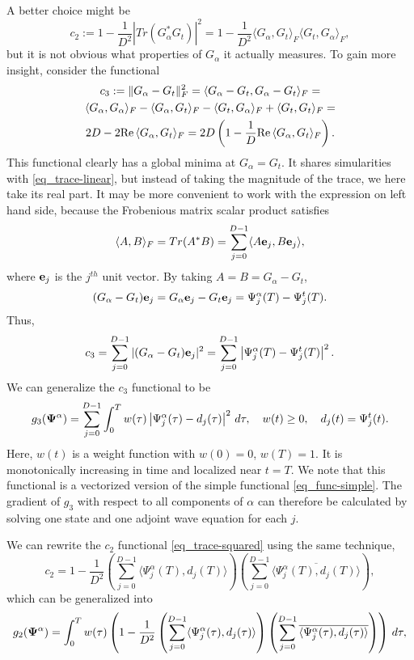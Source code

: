 \documentclass[11pt]{article}
\begin{document}
A better choice might be
\begin{equation}\label{eq_trace-squared}
c_2 := 1 - \frac{1}{D^2} |Tr (G_\alpha^* G_t)|^2 = 1 - \frac{1}{D^2} \langle G_\alpha, G_t \rangle_F
\langle G_t,  G_\alpha \rangle_F,
\end{equation}
but it is not obvious what properties of $G_\alpha$ it actually measures. To gain more insight,
consider the functional
\begin{multline}\label{eq_trace-real}
  c_3 := \| G_\alpha-G_t \|_F^2 = \langle G_\alpha-G_t, G_\alpha-G_t \rangle_F = \\
  \langle G_\alpha, G_\alpha \rangle_F - \langle G_\alpha, G_t \rangle_F  -
  \langle G_t, G_\alpha \rangle_F + \langle G_t, G_t \rangle_F =\\
  2D - 2{\rm Re}\, \langle G_\alpha, G_t \rangle_F = 2D\left( 1 - \frac{1}{D} {\rm Re}\, \langle
  G_\alpha, G_t \rangle_F\right). 
\end{multline}
This functional clearly has a global minima at $G_\alpha=G_t$. It shares simularities with
\eqref{eq_trace-linear}, but instead of taking the magnitude of the trace, we here take its real
part. It may be more convenient to work with the expression on left hand
side, because the Frobenious matrix scalar product satisfies
\[
\langle A, B \rangle_F = Tr(A^* B) = \sum_{j=0}^{D-1} \langle A{\mathbf e}_j, B{\mathbf e}_j\rangle,
\]
where ${\mathbf e}_j$ is the $j^{th}$ unit vector. By taking $A=B=G_\alpha - G_t$,
\[
(G_\alpha - G_t){\mathbf e}_j = G_\alpha{\mathbf e}_j - G_t{\mathbf e}_j = \Psi_j^\alpha(T) - \Psi_j^t(T).
\]
Thus,
\[
c_3 = \sum_{j=0}^{D-1} |(G_\alpha - G_t){\mathbf e}_j|^2 = \sum_{j=0}^{D-1} \left| \Psi_j^\alpha(T) -
\Psi_j^t(T) \right|^2.
\]
We can generalize the $c_3$ functional to be
\begin{equation}
g_3({\mathbf \Psi}^\alpha) =  \sum_{j=0}^{D-1} \int_0^T w(\tau) \left| \Psi_j^\alpha(\tau) - d_j(\tau)
\right|^2\, d\tau,\quad w(t) \geq 0,\quad d_j(t)=\Psi_j^t(t).
\end{equation}
Here, $w(t)$ is a weight function with $w(0)=0$, $w(T)=1$. It is monotonically increasing in time
and localized near $t=T$. We note that this functional is a
vectorized version of the simple functional \eqref{eq_func-simple}. The gradient of $g_3$ with
respect to all components of $\alpha$ can therefore be calculated by solving one state and one
adjoint wave equation for each $j$.

We can rewrite the $c_2$ functional \eqref{eq_trace-squared} using the same technique,
\[
c_2 = 1 - \frac{1}{D^2} \left( \sum_{j=0}^{D-1}\langle \Psi^\alpha_j(T), d_j(T)\rangle \right) \left(
\sum_{j=0}^{D-1}\overline{\langle \Psi^\alpha_j(T), d_j(T)\rangle} \right),
\]
which can be generalized into
\begin{equation}
  g_2({\mathbf \Psi}^\alpha) =  \int_0^T w(\tau) \left(
   1 - \frac{1}{D^2} \left( \sum_{j=0}^{D-1}\langle \Psi^\alpha_j(\tau), d_j(\tau)\rangle \right) \left(
\sum_{j=0}^{D-1}\overline{\langle \Psi^\alpha_j(\tau), d_j(\tau)\rangle} \right)
  \right)
  \, d\tau,
\end{equation}
\end{document}
